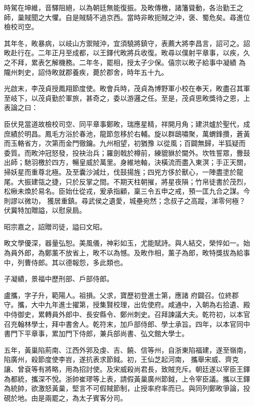 \begin{pinyinscope}
 時駕在坤維，音驛阻絕，以為朝廷無能復振。及畋傳檄，諸籓聳動，各治勤王之師，巢賊聞之大懼。自是賊騎不過京西。當時非畋扼賊之沖，褒、蜀危矣。尋進位檢校司空。



 其年冬，畋暴病，以岐山方禦賊沖，宜須驍將鎮守，表薦大將李昌言，詔可之。詔畋赴行在。二年正月至成都，以王鐸代畋將兵收復。畋尋以僕射平章事，以疾，久之不拜，累表乞解機務。二年冬，罷相，授太子少保。僖宗以畋子給事中凝績
 為隴州刺史，詔侍畋就郡養疾，薨於郡舍，時年五十九。



 光啟末，李茂貞授鳳翔節度使。畋會兵時，茂貞為博野軍小校在奉天，畋盡召其軍至岐下，以茂貞勤於軍旅，甚奇之，委以游邏之任。至是，茂貞思畋獎待之恩，上表論之曰：



 臣伏見當道故檢校司空、同平章事鄭畋，瑞應星精，祥開月角；建洪爐於聖代，成庶績於明昌。鳳毛方浴於春池，龍節忽移於右輔。旋以群鴟嘯聚，萬蝟鋒攢，蒼黃而玉輅省方，次第而金門徹鑰。九州相望，初猶豫
 以從風；百闢無歸，半狐疑而委質。而畋沖冠怒發，投袂治兵；羅劍戟於樽前，練貔貅於閫外。坎牲誓眾，釁鼓出師；馳羽檄於四方，暢皇威於萬里。身維地軸，決橫流而盡入東溟；手正天關，掃妖星而重尊北極。及至囊沙減灶，伐鼓揚旌；四兇方侈於獸心，一陣盡塗於龍尾。大振建瓴之捷，只於反掌之間。不期天柱朝摧，將星夜隕；竹帛徒書於茂烈，松楸未煥於易名。臣始仕從戎，爰承指顧，稟三令五申之戒，預一匡九合之謀。今則謬以微功，
 獲居重鎮。尋武侯之遺愛，城壘宛然；念叔子之高蹤，涕零何極？伏冀特加贈謚，以慰泉扃。



 昭宗嘉之，詔贈司徒，謚曰文昭。



 畋文學優深，器量弘恕。美風儀，神彩如玉，尤能賦詩。與人結交，榮悴如一。始為員外郎，為鄭薰不放省上，畋不以為憾。及畋作相，薰子為郎，畋特獎拔為給事中，列曹侍郎。其以德報怨，多此類也。



 子凝績，景福中歷刑部、戶部侍郎。



 盧攜，字子升，範陽人。祖損。父求，寶歷初登進士第，應諸
 府闢召。位終郡守。攜，大中九年進士擢第，授集賢校理，出佐使府。咸通中，入朝為右拾遺、殿中侍御史，累轉員外郎中、長安縣令、鄭州刺史。召拜諫議大夫。乾符初，以本官召充翰林學士，拜中書舍人。乾符末，加戶部侍郎、學士承旨。四年，以本官同中書門下平章事，累加門下侍郎，兼兵部尚書、弘文館大學士。



 五年，黃巢陷荊南、江西外郛及虔、吉、饒、信等州，自浙東陷福建，遂至嶺南，陷廣州，殺節度使李岧，遂抗表求節鉞。初，王仙芝起河南，
 攜舉宋威、齊克讓、曾袞等有將略，用為招討使。及宋威殺尚君長，致賊充斥。朝廷遂以宰臣王鐸為都統，攜深不悅。浙帥崔璆等上表，請假黃巢廣州節鉞，上令宰臣議。攜以王鐸為統帥，欲激怒黃巢，堅言不可假賊節制，止授率府率而已。與同列鄭畋爭論，投硯於地。由是兩罷之，為太子賓客分司。




\end{pinyinscope}
